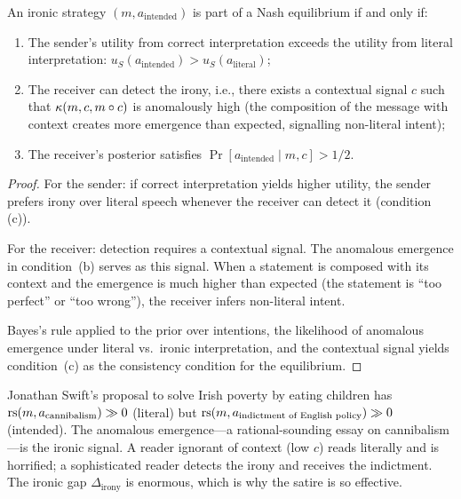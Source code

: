 \begin{theorem}
\label{thm:irony-equilibrium}
An ironic strategy $(m, a_{\mathrm{intended}})$ is part of a
Nash equilibrium if and only if:
\begin{enumerate}[label=(\alph*)]
  \item The sender's utility from correct interpretation exceeds
    the utility from literal interpretation:
    $u_S(a_{\mathrm{intended}}) > u_S(a_{\mathrm{literal}})$;
  \item The receiver can detect the irony, i.e., there exists
    a contextual signal $c$ such that
    $\kappa(m, c, m \circ c)$ is anomalously high
    (the composition of the message with context creates more
    emergence than expected, signalling non-literal intent);
  \item The receiver's posterior satisfies
    $\Pr[a_{\mathrm{intended}} \mid m, c] > 1/2$.
\end{enumerate}
\end{theorem}

\begin{proof}
For the sender: if correct interpretation yields higher utility,
the sender prefers irony over literal speech whenever the receiver
can detect it (condition (c)).

For the receiver: detection requires a contextual signal.  The
anomalous emergence in condition~(b) serves as this signal.
When a statement is composed with its context and the emergence
is much higher than expected (the statement is ``too perfect''
or ``too wrong''), the receiver infers non-literal intent.

Bayes's rule applied to the prior over intentions, the likelihood
of anomalous emergence under literal vs.\ ironic interpretation,
and the contextual signal yields condition~(c) as the
consistency condition for the equilibrium.
\end{proof}

\begin{example}
\label{ex:swift}
Jonathan Swift's proposal to solve Irish poverty by eating
children has $\mathrm{rs}(m, a_{\text{cannibalism}}) \gg 0$
(literal) but $\mathrm{rs}(m, a_{\text{indictment of English policy}}) \gg 0$
(intended).  The anomalous emergence---a rational-sounding
essay on cannibalism---is the ironic signal.  A reader
ignorant of context (low $c$) reads literally and is horrified;
a sophisticated reader detects the irony and receives the
indictment.  The ironic gap $\Delta_{\mathrm{irony}}$ is
enormous, which is why the satire is so effective.
\end{example}

